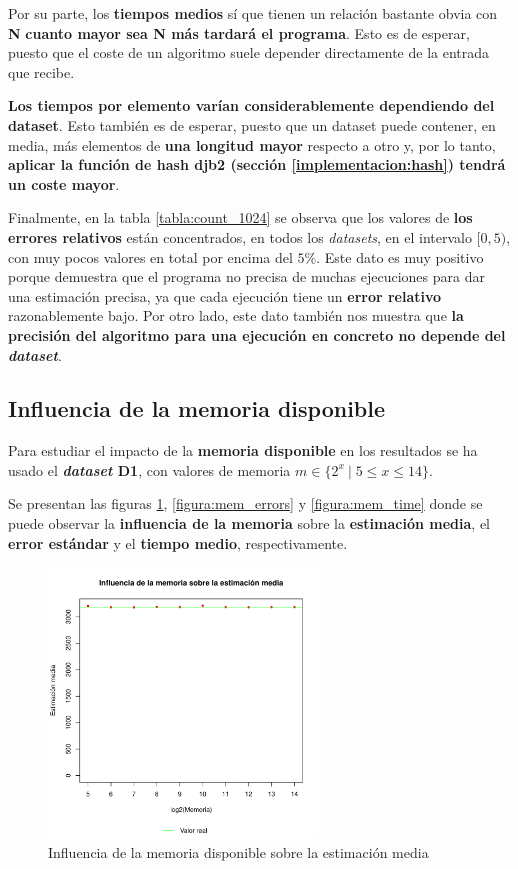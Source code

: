 Por su parte, los \textbf{tiempos medios} sí que tienen un relación bastante obvia con \textbf{N}
\textbf{cuanto mayor sea \textbf{N} más tardará el programa}. Esto es de esperar, puesto que el coste de un algoritmo suele
depender directamente de la entrada que recibe.

\textbf{Los tiempos por elemento varían considerablemente dependiendo del dataset}. Esto también es de esperar, puesto que
un dataset puede contener, en media, más elementos de \textbf{una longitud mayor} respecto a otro y, por lo tanto,
\textbf{aplicar la función de hash djb2 (sección \ref{implementacion:hash}) tendrá un coste mayor}.

Finalmente, en la tabla \ref{tabla:count_1024} se observa que los valores de \textbf{los errores relativos} están
concentrados, en todos los \emph{datasets}, en el intervalo $[0,5)$, con muy pocos valores en total por encima del $5\%$.
Este dato es muy positivo porque demuestra que el programa no precisa de muchas ejecuciones para dar una
estimación precisa, ya que cada ejecución tiene un \textbf{error relativo} razonablemente bajo. Por otro lado, este dato también
nos muestra que \textbf{la precisión del algoritmo para una ejecución en concreto no depende del \emph{dataset}}.

\subsection{Influencia de la memoria disponible}
\label{analisis:D1_mem}

Para estudiar el impacto de la \textbf{memoria disponible} en los resultados se ha usado el \textbf{\emph{dataset} D1},
con valores de memoria $m \in \{ 2^x \: | \; 5 \leq x \leq 14 \}$.

Se presentan las figuras \ref{figura:mem_estimation}, \ref{figura:mem_errors} y \ref{figura:mem_time} donde se puede observar la
\textbf{influencia de la memoria} sobre la \textbf{estimación media}, el \textbf{error estándar} y el \textbf{tiempo medio},
respectivamente.

\begin{figure}[h!]
    \centering
        \includegraphics[width=0.64\textwidth]{../figs/D1/mem_estimation_rel.pdf}
        \caption{Influencia de la memoria disponible sobre la estimación media}
    \label{figura:mem_estimation}
\end{figure}

